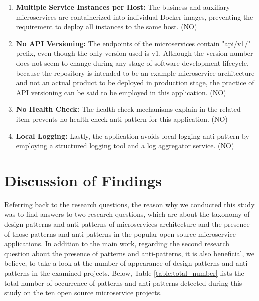 \documentclass{Configuration_Files/PoliMi3i_thesis}
\begin{document}
\begin{enumerate}
    \item \textbf{Multiple Service Instances per Host:} The business and auxiliary microservices are containerized into individual Docker images, preventing the requirement to deploy all instances to the same host. (NO)
    
    \item \textbf{No API Versioning:} The endpoints of the microservices contain "api/v1/" prefix, even though the only version used is v1.
    Although the version number does not seem to change during any stage of software development lifecycle, because the repository is intended to be an example microservice architecture and not an actual product to be deployed in production stage, the practice of API versioning can be said to be employed in this application. (NO)
    
    \item \textbf{No Health Check:} The health check mechanisms explain in the related item prevents no health check anti-pattern for this application. (NO)
    
    \item \textbf{Local Logging:} Lastly, the application avoids local logging anti-pattern by employing a structured logging tool and a log aggregator service. (NO)
\end{enumerate}

\section{Discussion of Findings}
\label{sec:discussion}

Referring back to the research questions, the reason why we conducted this study was to find answers to two research questions, which are about the taxonomy of design patterns and anti-patterns of microservices architecture and the presence of those patterns and anti-patterns in the popular open source microservice applications. 
In addition to the main work, regarding the second research question about the presence of patterns and anti-patterns, it is also beneficial, we believe, to take a look at the number of appearance of design patterns and anti-patterns in the examined projects.
Below, Table \ref{table:total_number} lists the total number of occurrence of patterns and anti-patterns detected during this study on the ten open source microservice projects.
\end{document}
